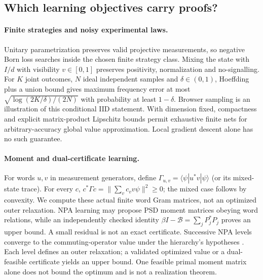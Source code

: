\documentclass[11pt,oneside,openany]{book}
\theoremstyle{definition}\newtheorem{definition}[theorem]{Definition}
\theoremstyle{remark}\newtheorem{remark}[theorem]{Remark}
\begin{document}
\subsection{Which learning objectives carry proofs?}
\paragraph{Finite strategies and noisy experimental laws.}
Unitary parametrization preserves valid projective measurements, so negative
Born loss searches inside the chosen finite strategy class. Mixing the state
with $I/d$ with visibility $v\in[0,1]$ preserves positivity, normalization and
no-signalling. For $K$ joint outcomes, $N$ ideal independent samples and
$\delta\in(0,1)$, Hoeffding plus a union bound gives maximum frequency error
at most $\sqrt{\log(2K/\delta)/(2N)}$ with probability at least $1-\delta$.
Browser sampling is an illustration of this conditional IID statement.
With dimension fixed, compactness and explicit matrix-product Lipschitz
bounds permit exhaustive finite nets for arbitrary-accuracy global value
approximation. Local gradient descent alone has no such guarantee.

\paragraph{Moment and dual-certificate learning.}
For words $u,v$ in measurement generators, define
$\Gamma_{u,v}=\langle\psi|u^*v|\psi\rangle$ (or its mixed-state trace).
For every $c$, $c^*\Gamma c=\|\sum_v c_vv\psi\|^2\ge0$; the mixed case
follows by convexity. We compute these actual finite word Gram matrices,
not an optimized outer relaxation. NPA learning may propose PSD moment
matrices obeying word relations, while an independently checked identity
$\beta I-\mathcal B=\sum_jP_j^*P_j$ proves an upper bound. A small residual
is not an exact certificate. Successive NPA levels converge to the
commuting-operator value under the hierarchy's hypotheses \cite{GameNPA}.
Each level defines an outer relaxation; a validated optimized value or a
dual-feasible certificate yields an upper bound. One feasible primal moment
matrix alone does not bound the optimum and is not a realization theorem.
\end{document}
